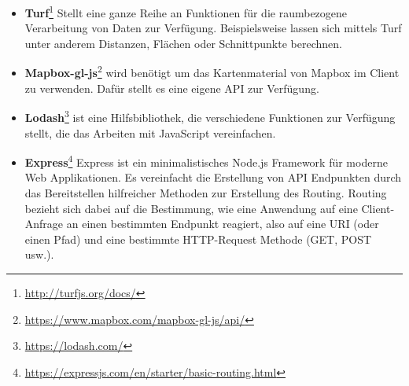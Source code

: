     \begin{itemize}[label={}]
      \item \textbf{Turf}\footnote{\url{http://turfjs.org/docs/}} Stellt eine ganze Reihe an Funktionen für die raumbezogene Verarbeitung von Daten zur Verfügung. Beispielsweise lassen sich mittels Turf unter anderem Distanzen, Flächen oder Schnittpunkte berechnen.

      \item \textbf{Mapbox-gl-js}\footnote{\url{https://www.mapbox.com/mapbox-gl-js/api/}} wird benötigt um das Kartenmaterial von Mapbox im Client zu verwenden. Dafür stellt es eine eigene API zur Verfügung.

      \item \textbf{Lodash}\footnote{\url{https://lodash.com/}} ist eine Hilfsbibliothek, die verschiedene Funktionen zur Verfügung stellt, die das Arbeiten mit JavaScript vereinfachen.

      \item \textbf{Express}\footnote{\url{https://expressjs.com/en/starter/basic-routing.html}} Express ist ein minimalistisches Node.js Framework für moderne Web Applikationen. Es vereinfacht die Erstellung von API Endpunkten durch das Bereitstellen hilfreicher Methoden zur Erstellung des Routing. Routing bezieht sich dabei auf die Bestimmung, wie eine Anwendung auf eine Client-Anfrage an einen bestimmten Endpunkt reagiert, also auf eine URI (oder einen Pfad) und eine bestimmte HTTP-Request Methode (GET, POST usw.).
    \end{itemize}
    
